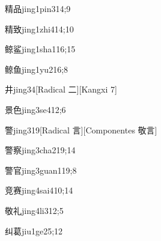\begin{verbete}{精品}{jing1pin3}{14;9}
\end{verbete}

\begin{verbete}{精致}{jing1zhi4}{14;10}
\end{verbete}

\begin{verbete}{鲸鲨}{jing1sha1}{16;15}
\end{verbete}

\begin{verbete}{鲸鱼}{jing1yu2}{16;8}
\end{verbete}

\begin{verbete}{井}{jing3}{4}[Radical 二][Kangxi 7]
\end{verbete}

\begin{verbete}{景色}{jing3se4}{12;6}
\end{verbete}

\begin{verbete}{警}{jing3}{19}[Radical 言][Componentes 敬言]
\end{verbete}

\begin{verbete}{警察}{jing3cha2}{19;14}
\end{verbete}

\begin{verbete}{警官}{jing3guan1}{19;8}
\end{verbete}

\begin{verbete}{竞赛}{jing4sai4}{10;14}
\end{verbete}

\begin{verbete}{敬礼}{jing4li3}{12;5}
\end{verbete}

\begin{verbete}{纠葛}{jiu1ge2}{5;12}
\end{verbete}

